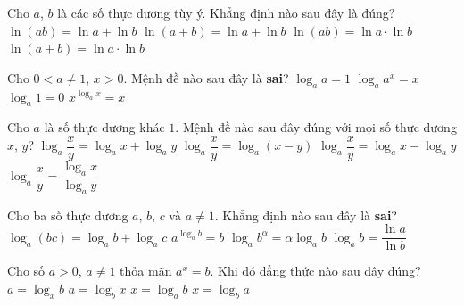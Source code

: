 \begin{ex}%
	Cho  $a$, $b$ là các số thực dương tùy ý. Khẳng định nào sau đây là đúng?
	 \choice
		{\True $\ln\left(ab\right)=\ln  a+\ln b$}
		 {$\ln\left(a+b\right)=\ln a+\ln b$}
		{$\ln\left(ab\right)=\ln a \cdot \ln b$} 
		{$\ln\left(a+b\right)=\ln a \cdot \ln b$} 
\end{ex}

\begin{ex}%
	Cho $0<a\ne1$, $x>0$. Mệnh đề  nào sau đây là \textbf{sai}?
	\choice 
		 {$\log_{a}a=1$}
		 {$\log_{a}a^{x}=x$}
		 {$\log_{a}1=0$}
		 {\True $x^{\log_{a}x}=x$}
\end{ex}

\begin{ex}%
	Cho  $a$ là số thực dương khác $1$. Mệnh đề nào sau đây đúng với mọi số thực dương $x$, $y$?
	 \choice
		{$\log_{a}\dfrac{x}{y}=\log_{a}x+\log_{a}y$} 
		{$\log_{a}\dfrac{x}{y}=\log_{a}\left(x-y\right)$} 
		 {\True $\log_{a}\dfrac{x}{y}=\log_{a}x-\log_{a}y$}
		{$\log_{a}\dfrac{x}{y}=\dfrac{\log_{a}x}{\log_{a}y}$} 
\end{ex}

\begin{ex}%
	Cho ba số thực dương $a$, $b$, $c$ và $a\ne1$. Khẳng định nào sau đây  là \textbf{sai}?
	\choice 
		{$\log_{a}\left(bc\right)=\log_{a}b+\log_{a}c$} 
		{$a^{\log_{a}b}=b$} 
		{$\log_{a}b^{\alpha}=\alpha\log_{a}b$} 
		{\True $\log_{a}b=\dfrac{\ln a}{\ln  b}$}
\end{ex}

\begin{ex}%
	Cho số $a>0$, $a\ne 1$ thỏa mãn $a^x=b$. Khi  đó đẳng thức nào sau đây đúng?
	\choice 
		{$a=\log_{x}b$} 
		 {$a=\log_bx$}
		{\True  $x=\log_ab$}
		 {$x=\log_ba$}
\end{ex}

